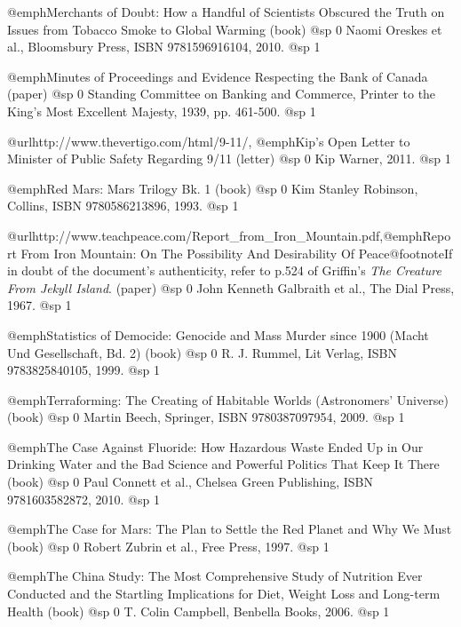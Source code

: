 \item
@emph{Merchants of Doubt: How a Handful of Scientists Obscured the Truth on Issues from Tobacco Smoke to Global Warming} (book)
@sp 0
Naomi Oreskes et al., Bloomsbury Press, ISBN 9781596916104, 2010.
@sp 1

\item
@emph{Minutes of Proceedings and Evidence Respecting the Bank of Canada} (paper)
@sp 0
Standing Committee on Banking and Commerce, Printer to the King's Most Excellent Majesty, 1939, pp. 461-500.
@sp 1

\item
@url{http://www.thevertigo.com/html/9-11/, @emph{Kip's Open Letter to Minister of Public Safety Regarding 9/11}} (letter)
@sp 0
Kip Warner, 2011.
@sp 1

\item
@emph{Red Mars: Mars Trilogy Bk. 1} (book)
@sp 0
Kim Stanley Robinson, Collins, ISBN 9780586213896, 1993.
@sp 1

\item
@url{http://www.teachpeace.com/Report_from_Iron_Mountain.pdf,@emph{Report From Iron Mountain: On The Possibility And Desirability Of Peace}}@footnote{If in doubt of the document's authenticity, refer to p.524 of Griffin's {\it The Creature From Jekyll Island}.} (paper)
@sp 0
John Kenneth Galbraith et al., The Dial Press, 1967.
@sp 1

\item
@emph{Statistics of Democide: Genocide and Mass Murder since 1900 (Macht Und Gesellschaft, Bd. 2)} (book)
@sp 0
R. J. Rummel, Lit Verlag, ISBN 9783825840105, 1999.
@sp 1

\item
@emph{Terraforming: The Creating of Habitable Worlds (Astronomers' Universe)} (book)
@sp 0
Martin Beech, Springer, ISBN 9780387097954, 2009.
@sp 1

\item
@emph{The Case Against Fluoride: How Hazardous Waste Ended Up in Our Drinking Water and the Bad Science and Powerful Politics That Keep It There} (book)
@sp 0
Paul Connett et al., Chelsea Green Publishing, ISBN 9781603582872, 2010.
@sp 1

\item
@emph{The Case for Mars: The Plan to Settle the Red Planet and Why We Must} (book)
@sp 0
Robert Zubrin et al., Free Press, 1997.
@sp 1

\item
@emph{The China Study: The Most Comprehensive Study of Nutrition Ever Conducted and the Startling Implications for Diet, Weight Loss and Long-term Health} (book)
@sp 0
T. Colin Campbell, Benbella Books, 2006.
@sp 1


